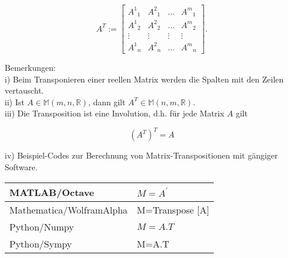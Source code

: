\documentclass[10pt]{article}
\begin{document}
\[
A^{T}:=\left[\begin{array}{llll}
A^{1}{ }_{1} & A^{2}{ }_{1} & \ldots & A^{m}{ }_{1}  \tag{6.9}\\
A^{1}{ }_{2} & A^{2}{ }_{2} & \ldots & A^{m}{ }_{2} \\
\vdots & \vdots & \vdots & \vdots \\
A^{1}{ }_{n} & A^{2}{ }_{n} & \ldots & A^{m}{ }_{n}
\end{array}\right] .
\]

Bemerkungen:\\
i) Beim Transponieren einer reellen Matrix werden die Spalten mit den Zeilen vertauscht.\\
ii) Ist $A \in \mathbb{M}(m, n, \mathbb{R})$, dann gilt $A^{T} \in \mathbb{M}(n, m, \mathbb{R})$.\\
iii) Die Transposition ist eine Involution, d.h. für jede Matrix $A$ gilt


\begin{equation*}
\left(A^{T}\right)^{T}=A \tag{6.10}
\end{equation*}


iv) Beispiel-Codes zur Berechnung von Matrix-Transpositionen mit gängiger Software.

\begin{center}
\begin{tabular}{|l|l|}
\hline
MATLAB/Octave & $M=A^{\prime}$ \\
\hline
Mathematica/WolframAlpha & M=Transpose [A] \\
\hline
Python/Numpy & $M=A . T$ \\
\hline
Python/Sympy & M=A.T \\
\hline
\end{tabular}
\end{center}
\end{document}

